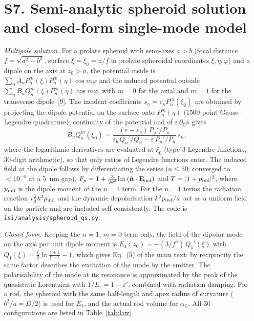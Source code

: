 \documentclass[11pt,a4paper]{article}
\newcommand{\Fp}{F_p}
\begin{document}
\section*{S7. Semi-analytic spheroid solution and closed-form single-mode model}
\emph{Multipole solution.} For a prolate spheroid with semi-axes $a>b$ (focal distance $f=\sqrt{a^2-b^2}$, surface
$\xi=\xi_0=a/f$ in prolate spheroidal coordinates $\xi,\eta,\varphi$) and a dipole on the axis at $z_0>a$, the potential
inside is $\sum_n A_nP_n^m(\xi)P_n^m(\eta)\cos m\varphi$ and the induced potential outside
$\sum_n B_nQ_n^m(\xi)P_n^m(\eta)\cos m\varphi$, with $m=0$ for the axial and $m=1$ for the transverse dipole~[9]. The
incident coefficients $s_n=c_nP_n^m(\xi_0)$ are obtained by projecting the dipole potential on the surface onto
$P_n^m(\eta)$ (1500-point Gauss--Legendre quadrature); continuity of the potential and of $\varepsilon\,\partial_\xi\phi$
gives
\begin{equation}
B_nQ_n^m(\xi_0)=\frac{(\varepsilon-\varepsilon_b)\,P_n'/P_n}{\varepsilon_b\,Q_n'/Q_n-\varepsilon\,P_n'/P_n}\,s_n ,
\end{equation}
where the logarithmic derivatives are evaluated at $\xi_0$ (type-3 Legendre functions, 30-digit arithmetic), so that
only ratios of Legendre functions enter. The induced field at the dipole follows by differentiating the series
($n\leq50$; converged to $<10^{-6}$ at a \SI{5}{nm} gap), $\Fp=1+\tfrac{3}{2k^3}\mathrm{Im}\,(\hat{\mathbf n}\cdot\mathbf E_{\rm ind})$
and $T=|1+p_{\rm ind}|^2$, where $p_{\rm ind}$ is the dipole moment of the $n=1$ term. For the $n=1$ terms the
radiation reaction $i\tfrac23k^3p_{\rm ind}$ and the dynamic depolarisation $k^2p_{\rm ind}/a$ act as a uniform
field on the particle and are included self-consistently. The code is \texttt{isi/analysis/spheroid\_qs.py}.

\emph{Closed form.} Keeping the $n=1$, $m=0$ term only, the field of the dipolar mode on the axis per unit dipole
moment is $E_1(z_0)=-(3/f^3)\,Q_1'(\xi)$ with $Q_1(\xi)=\tfrac{\xi}{2}\ln\frac{\xi+1}{\xi-1}-1$, which gives
Eq.~(5) of the main text; by reciprocity the same factor describes the excitation of the mode by the emitter. The
polarisability of the mode at its resonance is approximated by the peak of the quasistatic Lorentzian with
$1/L_z=1-\varepsilon'$, combined with radiation damping. For a rod, the spheroid with the same half-length and apex
radius of curvature ($b^2/a=D/2$) is used for $E_1$, and the actual rod volume for $\alpha_L$. All 30 configurations
are listed in Table~\ref{tab:law}.
\end{document}
